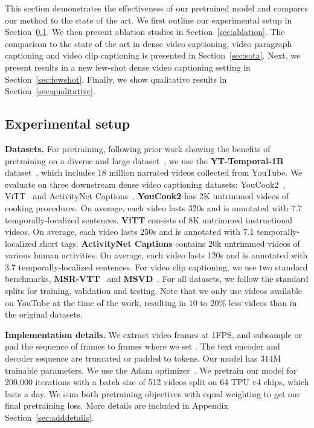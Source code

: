 \vspace{-0.1cm}

This section demonstrates the effectiveness of our pretrained \model{} model and compares our method to the state of the art.
We first outline our experimental setup in Section~\ref{sec:setup}.
We then present ablation studies in Section~\ref{sec:ablation}.
The comparison to the state of the art in dense video captioning, video paragraph captioning and video clip captioning is presented in Section~\ref{sec:sota}. 
Next, we present results in a new few-shot dense video captioning setting in Section~\ref{sec:fewshot}. 
Finally, we show qualitative results in Section~\ref{sec:qualitative}. 

\subsection{Experimental setup}\label{sec:setup}
\vspace{-0.1cm}


\noindent \textbf{Datasets.} 
For pretraining, following prior work showing the benefits of pretraining on a diverse and large dataset~\cite{zellers2021merlot}, we use the \textbf{YT-Temporal-1B} dataset~\cite{zellers2022merlot}, which includes 18 million narrated videos collected from YouTube.
We evaluate \model{} on three downstream dense video captioning datasets: YouCook2~\cite{youcook2}, ViTT~\cite{huang2020multimodal} and ActivityNet Captions~\cite{krishna2017dense}.
\textbf{YouCook2} has 2K untrimmed videos of cooking procedures.
On average, each video lasts 320s and is annotated with 7.7 temporally-localized sentences.
\textbf{ViTT} consists of 8K untrimmed instructional videos.
On average, each video lasts 250s and is annotated with 7.1 temporally-localized short tags.
\textbf{ActivityNet Captions} contains 20k untrimmed videos of various human activities.
On average, each video lasts 120s and is annotated with 3.7 temporally-localized sentences. 
For video clip captioning, we use two standard benchmarks, \textbf{MSR-VTT}~\cite{xu16msrvtt} and \textbf{MSVD}~\cite{chen2011collecting}.
For all datasets, we follow the standard splits for training, validation and testing.
Note that we only use videos available on YouTube at the time of the work, resulting in 10 to 20\% less videos than in the original datasets.

\noindent \textbf{Implementation details.} 
We extract video frames at 1FPS, and subsample or pad the sequence of frames to  frames where we set .
The text encoder and decoder sequence are truncated or padded to  tokens.
Our model has 314M trainable parameters.
We use the Adam optimizer~\cite{kingma15adam}.
We pretrain our model for 200,000 iterations with a batch size of 512 videos split on 64 TPU v4 chips, which lasts a day.
We sum both pretraining objectives with equal weighting to get our final pretraining loss.
More details are included in Appendix Section~\ref{sec:adddetails}.


